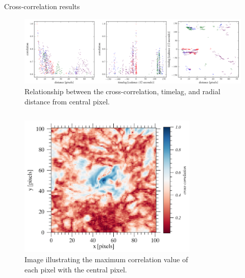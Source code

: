 \documentclass[t]{beamer}
\begin{document}
\begin{frame}[t]
\begin{block}{}
\begin{columns}
        \begin{block}{Cross-correlation results}
            \begin{figure}
                \includegraphics[width=\textwidth]{../test2.png}
                \caption{Relationship between the cross-correlation,
                timelag, and radial distance from central pixel.}
            \end{figure}
            \begin{columns}
                \begin{figure}
                    \includegraphics[width=\textwidth]{cc_color_2.png}
                    \caption{Image illustrating the maximum correlation
                        value of each pixel with the central pixel.}
                \end{figure}
                \begin{figure}

\end{figure}
\end{columns}
\end{block}
\end{columns}
\end{block}
\end{frame}
\end{document}
